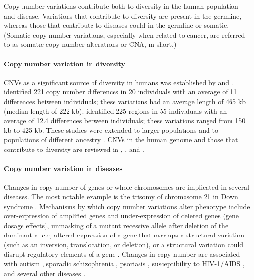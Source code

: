 Copy number variations contribute both to diversity in the human
population and disease.
Variations that contribute to diversity are present in the germline,
whereas those that contribute to diseases could in the germline or
somatic. (Somatic copy number variations, especially when related to
cancer, are referred to as somatic copy number alterations or
CNA, in short.)

\paragraph{Copy number variation in diversity}
CNVs as a significant source of diversity in humans was established by
\cite{sebat2004large} and \cite{iafrate2004detection}.
%
\cite{sebat2004large} identified 221 copy number differences in 20
individuals with an average of 11 differences between individuals; these
variations had an average length of 465 kb (median length of 222 kb).
%
\cite{iafrate2004detection} identified 225 regions in 55 individuals
with an average of 12.4 differences between individuals; these
variations ranged from 150 kb to 425 kb.
%
These studies were extended to larger populations and to populations of
different ancestry \citep{redon2006global,li2009whole}.  CNVs in the
human genome and those that contribute to diversity are reviewed in
\cite{freeman2006copy}, \cite{feuk2006structural}, and
\cite{zarrei2015copy}.

\paragraph{Copy number variation in diseases}
Changes in copy number of genes or whole chromosomes are implicated in
several diseases. The most notable example is the trisomy of chromosome
21 in Down syndrome \citep{antonarakis2004chromosome}.
%
Mechanisms by which copy number variations alter phenotype include
over-expression of amplified genes and under-expression of deleted genes
(gene dosage effects), unmasking of a mutant recessive allele after
deletion of the dominant allele, altered expression of a gene that
overlaps a structural variation (such as an inversion, translocation, or
deletion), or a structural variation could disrupt regulatory elements
of a gene \citep{feuk2006structural}.
%
Changes in copy number are associated with autism
\citep{sebat2007strong}, sporadic schizophrenia \citep{xu2008strong},
psoriasis \citep{hollox2008psoriasis}, susceptibility to HIV-1/AIDS
\citep{gonzalez2005influence}, and several other diseases
\citep{stankiewicz2010structural,fanciulli2010gene}.

